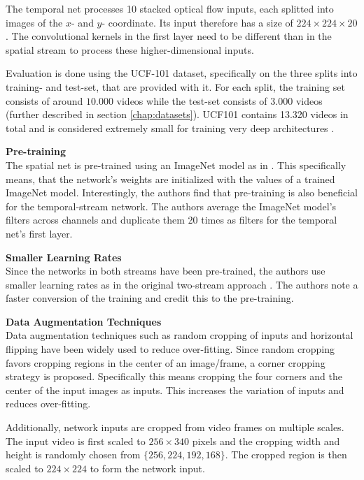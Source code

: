 The temporal net processes 10 stacked optical flow inputs, each splitted into images of the $x$- and $y$- coordinate.
Its input therefore has a size of $224 \times 224 \times 20$.
The convolutional kernels in the first layer need to be different than in the spatial stream to process these higher-dimensional inputs.

Evaluation is done using the UCF-101 dataset, specifically on the three splits into training- and test-set, that are provided with it.
For each split, the training set consists of around $10.000$ videos while the test-set consists of $3.000$ videos (further described in section \ref{chap:datasets}).
UCF101 contains 13.320 videos in total and is considered extremely small for training very deep architectures \cite{wang_towards_2015}.

\textbf{Pre-training}\\
The spatial net is pre-trained using an ImageNet model as in \cite{simonyan_two-stream_2014}.
This specifically means, that the network's weights are initialized with the values of a trained ImageNet model.
Interestingly, the authors find that pre-training is also beneficial for the temporal-stream network.
The authors average the ImageNet model's filters across channels and duplicate them 20 times as filters for the temporal net's first layer.

\textbf{Smaller Learning Rates}\\
Since the networks in both streams have been pre-trained, the authors use smaller learning rates as in the original two-stream approach \cite{simonyan_two-stream_2014}.
The authors note a faster conversion of the training and credit this to the pre-training.

\textbf{Data Augmentation Techniques}\\
Data augmentation techniques such as random cropping of inputs and horizontal flipping have been widely used to reduce over-fitting.
Since random cropping favors cropping regions in the center of an image/frame, a corner cropping strategy is proposed.
Specifically this means cropping the four corners and the center of the input images as inputs.
This increases the variation of inputs and reduces over-fitting.

Additionally, network inputs are cropped from video frames on multiple scales.
The input video is first scaled to $256 \times 340$ pixels and the cropping width and height is randomly chosen from $\{256, 224, 192, 168\}$.
The cropped region is then scaled to $224 \times 224$ to form the network input.

